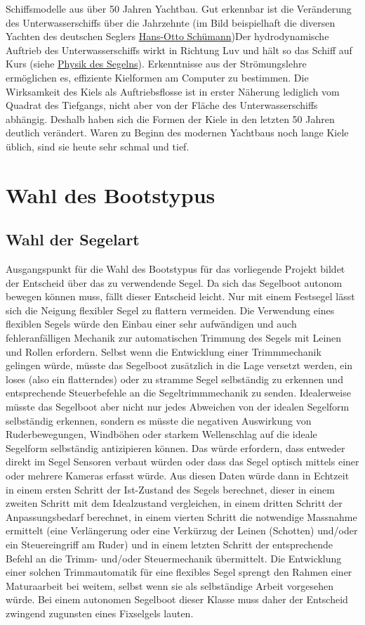Schiffsmodelle aus über 50 Jahren Yachtbau. Gut erkennbar ist die Veränderung des Unterwasserschiffs über die Jahrzehnte (im Bild beispielhaft die diversen Yachten des deutschen Seglers \href{https://de.wikipedia.org/wiki/Hans-Otto_Sch\%C3\%BCmann}{Hans-Otto Schümann})Der hydrodynamische Auftrieb des Unterwasserschiffs wirkt in Richtung Luv und hält so das Schiff auf Kurs (siehe \href{https://de.wikipedia.org/wiki/Physik_des_Segelns}{Physik des Segelns}). Erkenntnisse aus der Strömungslehre ermöglichen es, effiziente Kielformen am Computer zu bestimmen. Die Wirksamkeit des Kiels als Auftriebsflosse ist in erster Näherung lediglich vom Quadrat des Tiefgangs, nicht aber von der Fläche des Unterwasserschiffs abhängig. Deshalb haben sich die Formen der Kiele in den letzten 50 Jahren deutlich verändert. Waren zu Beginn des modernen Yachtbaus noch lange Kiele üblich, sind sie heute sehr schmal und tief. 

 




\section{Wahl des Bootstypus}
\subsection{Wahl der Segelart}
Ausgangspunkt für die Wahl des Bootstypus für das vorliegende Projekt bildet der Entscheid über das zu verwendende Segel. Da sich das Segelboot autonom bewegen können muss, fällt dieser Entscheid leicht. Nur mit einem Festsegel lässt sich die Neigung flexibler Segel zu flattern vermeiden. 
Die Verwendung eines flexiblen Segels würde den Einbau einer sehr aufwändigen und auch fehleranfälligen Mechanik zur automatischen Trimmung des Segels mit Leinen und Rollen erfordern. 
Selbst wenn die Entwicklung einer Trimmmechanik gelingen würde, müsste das Segelboot zusätzlich in die Lage versetzt werden, ein loses (also ein flatterndes) oder zu stramme Segel selbständig zu erkennen und entsprechende Steuerbefehle an die Segeltrimmmechanik zu senden. Idealerweise müsste das Segelboot aber nicht nur jedes Abweichen von der idealen Segelform selbständig erkennen, sondern es müsste die negativen Auswirkung von Ruderbewegungen, Windböhen oder starkem Wellenschlag auf die ideale Segelform selbständig antizipieren können. Das würde erfordern, dass entweder direkt im Segel Sensoren verbaut würden oder dass das Segel optisch mittels einer oder mehrere Kameras erfasst würde. Aus diesen Daten würde dann in Echtzeit in einem ersten Schritt der Ist-Zustand des Segels berechnet, dieser in einem zweiten Schritt mit dem Idealzustand vergleichen, in einem dritten Schritt der Anpassungsbedarf berechnet, in einem vierten Schritt die notwendige Massnahme ermittelt (eine Verlängerung oder eine Verkürzug der Leinen (Schotten) und/oder ein Steuereingriff am Ruder) und in einem letzten Schritt der entsprechende Befehl an die Trimm- und/oder Steuermechanik übermittelt. Die Entwicklung einer solchen Trimmautomatik für eine flexibles Segel sprengt den Rahmen einer Maturaarbeit bei weitem, selbst wenn sie als selbständige Arbeit vorgesehen würde. 
Bei einem autonomen Segelboot dieser Klasse muss daher der Entscheid zwingend zugunsten eines Fixselgels lauten.
